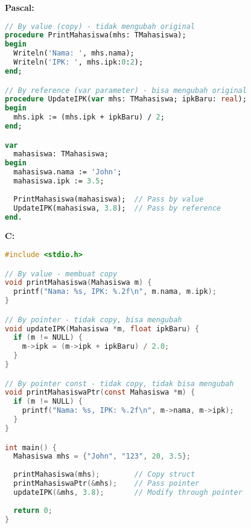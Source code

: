 \documentclass[../main.tex]{subfiles}
\begin{document}
\textbf{Pascal:}
\begin{lstlisting}[language=Pascal, caption={Passing record di Pascal}]
// By value (copy) - tidak mengubah original
procedure PrintMahasiswa(mhs: TMahasiswa);
begin
  Writeln('Nama: ', mhs.nama);
  Writeln('IPK: ', mhs.ipk:0:2);
end;

// By reference (var parameter) - bisa mengubah original
procedure UpdateIPK(var mhs: TMahasiswa; ipkBaru: real);
begin
  mhs.ipk := (mhs.ipk + ipkBaru) / 2;
end;

var
  mahasiswa: TMahasiswa;
begin
  mahasiswa.nama := 'John';
  mahasiswa.ipk := 3.5;
  
  PrintMahasiswa(mahasiswa);  // Pass by value
  UpdateIPK(mahasiswa, 3.8);  // Pass by reference
end.
\end{lstlisting}

\textbf{C:}
\begin{lstlisting}[language=C, caption={Passing struct di C}]
#include <stdio.h>

// By value - membuat copy
void printMahasiswa(Mahasiswa m) {
  printf("Nama: %s, IPK: %.2f\n", m.nama, m.ipk);
}

// By pointer - tidak copy, bisa mengubah
void updateIPK(Mahasiswa *m, float ipkBaru) {
  if (m != NULL) {
    m->ipk = (m->ipk + ipkBaru) / 2.0;
  }
}

// By pointer const - tidak copy, tidak bisa mengubah
void printMahasiswaPtr(const Mahasiswa *m) {
  if (m != NULL) {
    printf("Nama: %s, IPK: %.2f\n", m->nama, m->ipk);
  }
}

int main() {
  Mahasiswa mhs = {"John", "123", 20, 3.5};
  
  printMahasiswa(mhs);        // Copy struct
  printMahasiswaPtr(&mhs);    // Pass pointer
  updateIPK(&mhs, 3.8);       // Modify through pointer
  
  return 0;
}
\end{lstlisting}
\end{document}
